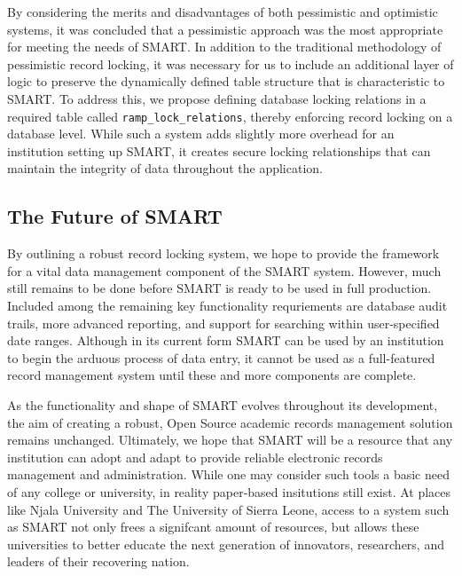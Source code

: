 \documentclass[12pt]{article}
\newcommand{\code}[1]{\texttt{#1}}
\begin{document}
By considering the merits and disadvantages of both pessimistic and optimistic systems, it was concluded that a pessimistic approach was the most appropriate for meeting the needs of SMART. In addition to the traditional methodology of pessimistic record locking, it was necessary for us to include an additional layer of logic to preserve the dynamically defined table structure that is characteristic to SMART. To address this, we propose defining database locking relations in a required table called \code{ramp\_lock\_relations}, thereby enforcing record locking on a database level. While such a system adds slightly more overhead for an institution setting up SMART, it creates secure locking relationships that can maintain the integrity of data throughout the application.

\subsection{The Future of SMART}
By outlining a robust record locking system, we hope to provide the framework for a vital data management component of the SMART system. However, much still remains to be done before SMART is ready to be used in full production. Included among the remaining key functionality requriements are database audit trails, more advanced reporting, and support for searching within user-specified date ranges. Although in its current form SMART can be used by an institution to begin the arduous process of data entry, it cannot be used as a full-featured record management system until these and more components are complete.

As the functionality and shape of SMART evolves throughout its development, the aim of creating a robust, Open Source academic records management solution remains unchanged. Ultimately, we hope that SMART will be a resource that any institution can adopt and adapt to provide reliable electronic records management and administration. While one may consider such tools a basic need of any college or university, in reality paper-based insitutions still exist. At places like Njala University and The University of Sierra Leone, access to a system such as SMART not only frees a signifcant amount of resources, but allows these universities to better educate the next generation of innovators, researchers, and leaders of their recovering nation.
\end{document}
